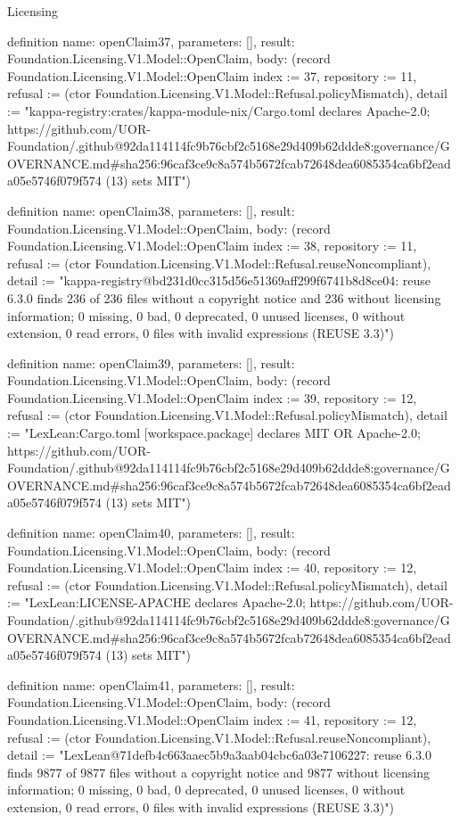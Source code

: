 \begin{lexlean}{Licensing}
\begin{semanticmodule}
definition{
  name: openClaim37,
  parameters: [],
  result: Foundation.Licensing.V1.Model::OpenClaim,
  body: (record Foundation.Licensing.V1.Model::OpenClaim {index := 37, repository := 11, refusal := (ctor Foundation.Licensing.V1.Model::Refusal.policyMismatch), detail := "kappa-registry:crates/kappa-module-nix/Cargo.toml declares Apache-2.0; https://github.com/UOR-Foundation/.github@92da114114fc9b76cbf2c5168e29d409b62ddde8:governance/GOVERNANCE.md#sha256:96caf3ce9c8a574b5672fcab72648dea6085354ca6bf2eada05e5746f079f574 (13) sets MIT"})
}

definition{
  name: openClaim38,
  parameters: [],
  result: Foundation.Licensing.V1.Model::OpenClaim,
  body: (record Foundation.Licensing.V1.Model::OpenClaim {index := 38, repository := 11, refusal := (ctor Foundation.Licensing.V1.Model::Refusal.reuseNoncompliant), detail := "kappa-registry@bd231d0cc315d56e51369aff299f6741b8d8ce04: reuse 6.3.0 finds 236 of 236 files without a copyright notice and 236 without licensing information; 0 missing, 0 bad, 0 deprecated, 0 unused licenses, 0 without extension, 0 read errors, 0 files with invalid expressions (REUSE 3.3)"})
}

definition{
  name: openClaim39,
  parameters: [],
  result: Foundation.Licensing.V1.Model::OpenClaim,
  body: (record Foundation.Licensing.V1.Model::OpenClaim {index := 39, repository := 12, refusal := (ctor Foundation.Licensing.V1.Model::Refusal.policyMismatch), detail := "LexLean:Cargo.toml [workspace.package] declares MIT OR Apache-2.0; https://github.com/UOR-Foundation/.github@92da114114fc9b76cbf2c5168e29d409b62ddde8:governance/GOVERNANCE.md#sha256:96caf3ce9c8a574b5672fcab72648dea6085354ca6bf2eada05e5746f079f574 (13) sets MIT"})
}

definition{
  name: openClaim40,
  parameters: [],
  result: Foundation.Licensing.V1.Model::OpenClaim,
  body: (record Foundation.Licensing.V1.Model::OpenClaim {index := 40, repository := 12, refusal := (ctor Foundation.Licensing.V1.Model::Refusal.policyMismatch), detail := "LexLean:LICENSE-APACHE declares Apache-2.0; https://github.com/UOR-Foundation/.github@92da114114fc9b76cbf2c5168e29d409b62ddde8:governance/GOVERNANCE.md#sha256:96caf3ce9c8a574b5672fcab72648dea6085354ca6bf2eada05e5746f079f574 (13) sets MIT"})
}

definition{
  name: openClaim41,
  parameters: [],
  result: Foundation.Licensing.V1.Model::OpenClaim,
  body: (record Foundation.Licensing.V1.Model::OpenClaim {index := 41, repository := 12, refusal := (ctor Foundation.Licensing.V1.Model::Refusal.reuseNoncompliant), detail := "LexLean@71defb4c663aaec5b9a3aab04cbc6a03e7106227: reuse 6.3.0 finds 9877 of 9877 files without a copyright notice and 9877 without licensing information; 0 missing, 0 bad, 0 deprecated, 0 unused licenses, 0 without extension, 0 read errors, 0 files with invalid expressions (REUSE 3.3)"})
}


\end{semanticmodule}
\end{lexlean}
